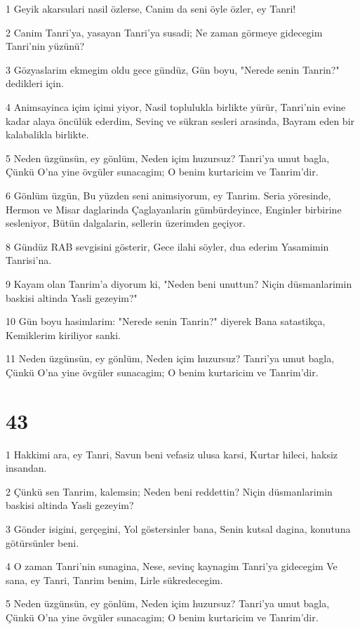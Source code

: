\par 1 Geyik akarsulari nasil özlerse, Canim da seni öyle özler, ey Tanri!
\par 2 Canim Tanri'ya, yasayan Tanri'ya susadi; Ne zaman görmeye gidecegim Tanri'nin yüzünü?
\par 3 Gözyaslarim ekmegim oldu gece gündüz, Gün boyu, "Nerede senin Tanrin?" dedikleri için.
\par 4 Animsayinca içim içimi yiyor, Nasil toplulukla birlikte yürür, Tanri'nin evine kadar alaya öncülük ederdim, Sevinç ve sükran sesleri arasinda, Bayram eden bir kalabalikla birlikte.
\par 5 Neden üzgünsün, ey gönlüm, Neden içim huzursuz? Tanri'ya umut bagla, Çünkü O'na yine övgüler sunacagim; O benim kurtaricim ve Tanrim'dir.
\par 6 Gönlüm üzgün, Bu yüzden seni animsiyorum, ey Tanrim. Seria yöresinde, Hermon ve Misar daglarinda Çaglayanlarin gümbürdeyince, Enginler birbirine sesleniyor, Bütün dalgalarin, sellerin üzerimden geçiyor.
\par 8 Gündüz RAB sevgisini gösterir, Gece ilahi söyler, dua ederim Yasamimin Tanrisi'na.
\par 9 Kayam olan Tanrim'a diyorum ki, "Neden beni unuttun? Niçin düsmanlarimin baskisi altinda Yasli gezeyim?"
\par 10 Gün boyu hasimlarim: "Nerede senin Tanrin?" diyerek Bana satastikça, Kemiklerim kiriliyor sanki.
\par 11 Neden üzgünsün, ey gönlüm, Neden içim huzursuz? Tanri'ya umut bagla, Çünkü O'na yine övgüler sunacagim; O benim kurtaricim ve Tanrim'dir.

\chapter{43}

\par 1 Hakkimi ara, ey Tanri, Savun beni vefasiz ulusa karsi, Kurtar hileci, haksiz insandan.
\par 2 Çünkü sen Tanrim, kalemsin; Neden beni reddettin? Niçin düsmanlarimin baskisi altinda Yasli gezeyim?
\par 3 Gönder isigini, gerçegini, Yol göstersinler bana, Senin kutsal dagina, konutuna götürsünler beni.
\par 4 O zaman Tanri'nin sunagina, Nese, sevinç kaynagim Tanri'ya gidecegim Ve sana, ey Tanri, Tanrim benim, Lirle sükredecegim.
\par 5 Neden üzgünsün, ey gönlüm, Neden içim huzursuz? Tanri'ya umut bagla, Çünkü O'na yine övgüler sunacagim; O benim kurtaricim ve Tanrim'dir.

